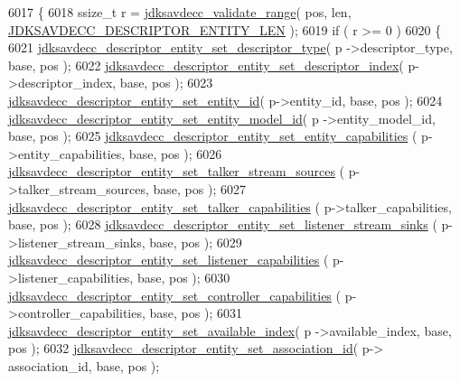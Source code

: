 \begin{DoxyCode}
6017 \{
6018     ssize\_t r = \hyperlink{group__util_ga9c02bdfe76c69163647c3196db7a73a1}{jdksavdecc\_validate\_range}( pos, len, 
      \hyperlink{group__descriptor__entity_ga552cb1772e36c821ac821ba95d69d52b}{JDKSAVDECC\_DESCRIPTOR\_ENTITY\_LEN} );
6019     \textcolor{keywordflow}{if} ( r >= 0 )
6020     \{
6021         \hyperlink{group__descriptor__entity_gae44bba0fd8511c6dffafce278c6a4427}{jdksavdecc\_descriptor\_entity\_set\_descriptor\_type}( p
      ->descriptor\_type, base, pos );
6022         \hyperlink{group__descriptor__entity_gac6083887de335dc57d31a4c23a395a83}{jdksavdecc\_descriptor\_entity\_set\_descriptor\_index}(
       p->descriptor\_index, base, pos );
6023         \hyperlink{group__descriptor__entity_gadbd4dde5f37ab2188c7a5ac8693e638f}{jdksavdecc\_descriptor\_entity\_set\_entity\_id}( p->entity\_id,
       base, pos );
6024         \hyperlink{group__descriptor__entity_ga69134d2205dee17b6ba7dd87ef1d5a5f}{jdksavdecc\_descriptor\_entity\_set\_entity\_model\_id}( p
      ->entity\_model\_id, base, pos );
6025         \hyperlink{group__descriptor__entity_ga1a1cc17b546b6b01df91e12d8c16b002}{jdksavdecc\_descriptor\_entity\_set\_entity\_capabilities}
      ( p->entity\_capabilities, base, pos );
6026         \hyperlink{group__descriptor__entity_ga15b656a41fed36bfa5663b3ef9698152}{jdksavdecc\_descriptor\_entity\_set\_talker\_stream\_sources}
      ( p->talker\_stream\_sources, base, pos );
6027         \hyperlink{group__descriptor__entity_gaa684191c7c3c055f1b36ab57cc05ff32}{jdksavdecc\_descriptor\_entity\_set\_talker\_capabilities}
      ( p->talker\_capabilities, base, pos );
6028         \hyperlink{group__descriptor__entity_gad42d175b456cbebc640cb8c65da07502}{jdksavdecc\_descriptor\_entity\_set\_listener\_stream\_sinks}
      ( p->listener\_stream\_sinks, base, pos );
6029         \hyperlink{group__descriptor__entity_ga9ac6c7fb1f7fe29f29e40623c462964e}{jdksavdecc\_descriptor\_entity\_set\_listener\_capabilities}
      ( p->listener\_capabilities, base, pos );
6030         \hyperlink{group__descriptor__entity_ga1a2d2134abe752eeedadf7ca4294ade9}{jdksavdecc\_descriptor\_entity\_set\_controller\_capabilities}
      ( p->controller\_capabilities, base, pos );
6031         \hyperlink{group__descriptor__entity_ga9cfc451c1a0984963caf97163e2370aa}{jdksavdecc\_descriptor\_entity\_set\_available\_index}( p
      ->available\_index, base, pos );
6032         \hyperlink{group__descriptor__entity_gacba8244a6fdae652303a4adb6221d63a}{jdksavdecc\_descriptor\_entity\_set\_association\_id}( p->
      association\_id, base, pos );

\end{DoxyCode}
